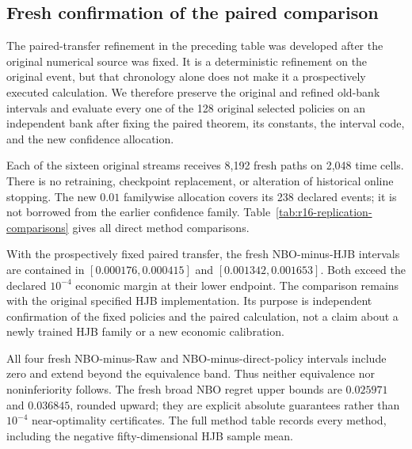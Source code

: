 \subsection{Fresh confirmation of the paired comparison}
\label{sec:r16replicationreading}
The paired-transfer refinement in the preceding table was developed after the original numerical source was fixed. It is a deterministic refinement on the original event, but that chronology alone does not make it a prospectively executed calculation. We therefore preserve the original and refined old-bank intervals and evaluate every one of the 128 original selected policies on an independent bank after fixing the paired theorem, its constants, the interval code, and the new confidence allocation.

Each of the sixteen original streams receives 8,192 fresh paths on 2,048 time cells. There is no retraining, checkpoint replacement, or alteration of historical online stopping. The new $0.01$ familywise allocation covers its 238 declared events; it is not borrowed from the earlier confidence family. Table~\ref{tab:r16-replication-comparisons} gives all direct method comparisons.


With the prospectively fixed paired transfer, the fresh NBO-minus-HJB intervals are contained in $[0.000176,0.000415]$ and $[0.001342,0.001653]$. Both exceed the declared $10^{-4}$ economic margin at their lower endpoint. The comparison remains with the original specified HJB implementation. Its purpose is independent confirmation of the fixed policies and the paired calculation, not a claim about a newly trained HJB family or a new economic calibration.

All four fresh NBO-minus-Raw and NBO-minus-direct-policy intervals include zero and extend beyond the equivalence band. Thus neither equivalence nor noninferiority follows. The fresh broad NBO regret upper bounds are $0.025971$ and $0.036845$, rounded upward; they are explicit absolute guarantees rather than $10^{-4}$ near-optimality certificates. The full method table records every method, including the negative fifty-dimensional HJB sample mean.

